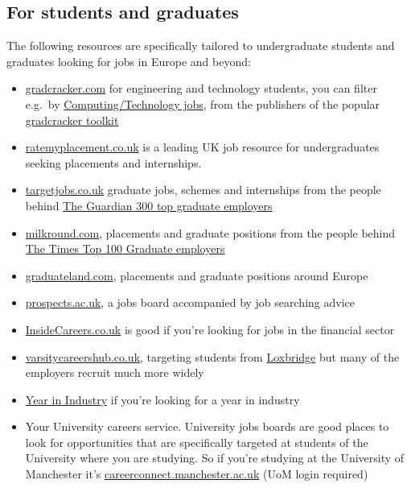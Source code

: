 \documentclass[
]{book}
\providecommand{\tightlist}{%
  \setlength{\itemsep}{0pt}\setlength{\parskip}{0pt}}
\begin{document}
\hypertarget{studentjobs}{%
\subsection{For students and graduates}\label{studentjobs}}

The following resources are specifically tailored to undergraduate students and graduates looking for jobs in Europe and beyond:

\begin{itemize}
\tightlist
\item
  \href{http://www.gradcracker.com/}{gradcracker.com} for engineering and technology students, you can filter e.g.~by \href{https://www.gradcracker.com/search/computing-technology/jobs}{Computing/Technology jobs}, from the publishers of the popular \href{http://www.gradcracker.com/career-centre/toolkit}{gradcracker toolkit}
\item
  \href{http://www.ratemyplacement.co.uk/}{ratemyplacement.co.uk} is a leading UK job resource for undergraduates seeking placements and internships.
\item
  \href{http://www.targetjobs.co.uk/}{targetjobs.co.uk} graduate jobs, schemes and internships from the people behind \href{https://targetjobs.co.uk/uk300}{The Guardian 300 top graduate employers}
\item
  \href{http://www.milkround.com/}{milkround.com}, placements and graduate positions from the people behind \href{https://digital.top100graduateemployers.com/view/979434180/}{The Times Top 100 Graduate employers}
\item
  \href{https://graduateland.com/}{graduateland.com}, placements and graduate positions around Europe
\item
  \href{https://www.prospects.ac.uk/}{prospects.ac.uk}, a jobs board accompanied by job searching advice
\item
  \href{https://www.insidecareers.co.uk}{InsideCareers.co.uk} is good if you're looking for jobs in the financial sector
\item
  \href{https://www.varsitycareershub.co.uk/}{varsitycareershub.co.uk}, targeting students from \href{https://en.wikipedia.org/wiki/Loxbridge}{Loxbridge} but many of the employers recruit much more widely
\item
  \href{https://www.etrust.org.uk/yini-vacancies}{Year in Industry} if you're looking for a year in industry
\item
  Your University careers service. University jobs boards are good places to look for opportunities that are specifically targeted at students of the University where you are studying. So if you're studying at the University of Manchester it's \href{https://careerconnect.manchester.ac.uk/user/jobs.html}{careerconnect.manchester.ac.uk} (UoM login required)
\end{itemize}
\end{document}
